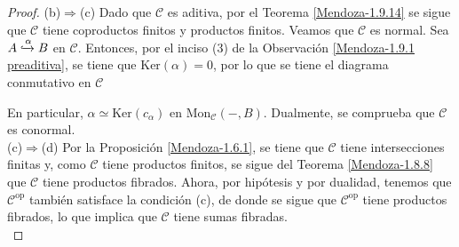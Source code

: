 \documentclass[tesis]{subfiles}
\begin{document}
\begin{proof}
    (b)$\Rightarrow$(c) Dado que $\mathscr{C}$ es aditiva, por el Teorema \ref{Mendoza-1.9.14} se sigue que $\mathscr{C}$ tiene coproductos finitos y productos finitos. Veamos que $\mathscr{C}$ es normal. Sea $A\xhookrightarrow{\alpha}B$ en $\mathscr{C}$. Entonces, por el inciso (3) de la Observación \ref{Mendoza-1.9.1 preaditiva}, se tiene que $\text{Ker}(\alpha)=0$, por lo que se tiene el diagrama conmutativo en $\mathscr{C}$
    \begin{center}
    \end{center}
    En particular, $\alpha\simeq\text{Ker}(c_\alpha)$ en $\text{Mon}_\mathscr{C}(-,B)$. Dualmente, se comprueba que $\mathscr{C}$ es conormal. \\

    (c)$\Rightarrow$(d) Por la Proposición \ref{Mendoza-1.6.1}, se tiene que $\mathscr{C}$ tiene intersecciones finitas y, como $\mathscr{C}$ tiene productos finitos, se sigue del Teorema \ref{Mendoza-1.8.8} que $\mathscr{C}$ tiene productos fibrados. Ahora, por hipótesis y por dualidad, tenemos que $\mathscr{C}^\text{op}$ también satisface la condición (c), de donde se sigue que $\mathscr{C}^\text{op}$ tiene productos fibrados, lo que implica que $\mathscr{C}$ tiene sumas fibradas. \\


\end{proof}
\end{document}
